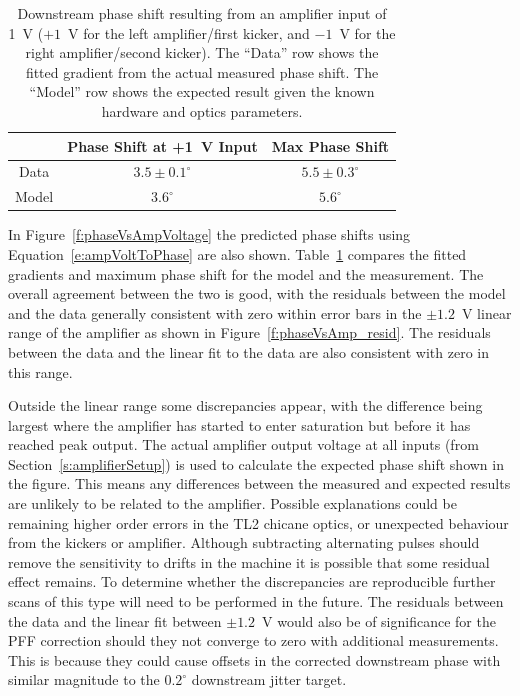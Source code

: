 \begin{table}
  \begin{center}
    \begin{tabular}{| c | c | c |}
	   \hline
        & Phase Shift at +1~V Input & Max Phase Shift \\ \hline
       Data & \(3.5\pm0.1^\circ\) & \(5.5\pm0.3^\circ\) \\
	   Model & \(3.6^\circ\) & \(5.6^\circ\) \\
 	   \hline
    \end{tabular}
    \caption{Downstream phase shift resulting from an amplifier input of 1~V (\(+1\)~V for the left amplifier/first kicker, and \(-1\)~V for the right amplifier/second kicker). The ``Data'' row shows the fitted gradient from the actual measured phase shift. The ``Model'' row shows the expected result given the known hardware and optics parameters.}
  	\label{t:PhaseVsDAC}
  \end{center}
\end{table}


In Figure~\ref{f:phaseVsAmpVoltage} the predicted phase shifts using Equation~\ref{e:ampVoltToPhase} are also shown. Table~\ref{t:PhaseVsDAC} compares the fitted gradients and maximum phase shift for the model and the measurement. The overall agreement between the two is good, with the residuals between the model and the data generally consistent with zero within error bars in the \(\pm1.2\)~V linear range of the amplifier as shown in Figure~\ref{f:phaseVsAmp_resid}. The residuals between the data and the linear 
fit to the data are also consistent with zero in this range.

Outside the linear range some discrepancies appear, with the difference being largest where the amplifier has started to enter saturation but before it has reached peak output. 
The actual amplifier output voltage at all inputs (from
 Section~\ref{s:amplifierSetup}) is used to calculate the expected phase shift shown in the figure. This means any differences between the measured and expected results are unlikely to be related to the amplifier.
Possible explanations could be remaining higher order errors in the TL2 chicane optics, or unexpected behaviour from the kickers or amplifier. Although subtracting alternating pulses should remove the sensitivity to drifts in the machine it is possible that some residual effect remains. To determine whether the discrepancies are reproducible further scans of this type will need to be performed in the future. The residuals between the data and the linear fit between \(\pm1.2\)~V would also be of significance for the PFF correction should they not converge to zero with additional measurements. This is because they could cause offsets in the corrected downstream phase with similar magnitude to the \(0.2^\circ\) downstream jitter target. 

